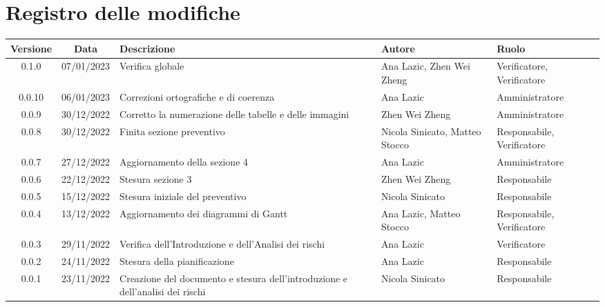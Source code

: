 \section*{Registro delle modifiche}
\begin{center}
	\renewcommand\tabularxcolumn[1]{>{\Centering}m{#1}}
	\begin{tabularx}{\textwidth}{| c | c | X | X | X |} 
		\hline
		\textbf{Versione} & \textbf{Data} & \textbf{Descrizione} & 	\textbf{Autore} & \textbf{Ruolo}\\
        \hline
	   0.1.0 & 07/01/2023 & Verifica globale & Ana Lazic, Zhen Wei Zheng & Verificatore, Verificatore \\
        \hline
	   0.0.10 & 06/01/2023 & Correzioni ortografiche e di coerenza & Ana Lazic & Amministratore \\
		\hline
		0.0.9 & 30/12/2022 & Corretto la numerazione delle tabelle e delle immagini & Zhen Wei Zheng & Amministratore\\
		\hline
		0.0.8 & 30/12/2022 & Finita sezione preventivo & Nicola Sinicato, Matteo Stocco & Responsabile, Verificatore\\
		\hline
		0.0.7 & 27/12/2022 & Aggiornamento della sezione 4 & Ana Lazic & 	Amministratore\\
		\hline
		0.0.6 & 22/12/2022 & Stesura sezione 3 & Zhen Wei Zheng & Responsabile\\
		\hline
		0.0.5 & 15/12/2022 & Stesura iniziale del preventivo & Nicola Sinicato & Responsabile\\
		\hline
		0.0.4 & 13/12/2022 & Aggiornamento dei diagrammi di Gantt & Ana Lazic, Matteo Stocco & Responsabile, Verificatore\\
		\hline
		0.0.3 & 29/11/2022 & Verifica dell'Introduzione e dell'Analisi dei rischi & Ana Lazic & Verificatore\\
		\hline
		0.0.2 & 24/11/2022 & Stesura della pianificazione & Ana Lazic & Responsabile\\
		\hline
		0.0.1 & 23/11/2022 & Creazione del documento e stesura dell'introduzione e dell'analisi dei rischi & Nicola Sinicato & Responsabile\\
		\hline
	\end{tabularx}
\end{center}
	
	

